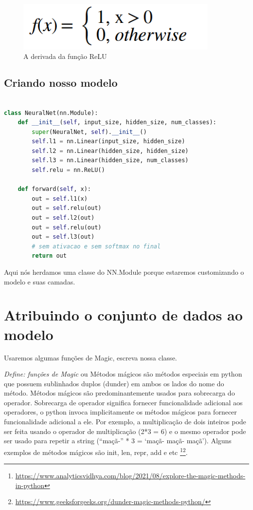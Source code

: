 \begin{figure}[H]
   \begin{center}
      \includegraphics[width=10cm]{img/relu3.png}
      \caption{A derivada da função ReLU} \label{relu3}
   \end{center}
\end{figure}


\subsection[Criando nosso modelo]{Criando nosso modelo}

\begin{lstlisting}[language=Python, caption=Modelo]

class NeuralNet(nn.Module):
    def __init__(self, input_size, hidden_size, num_classes):
        super(NeuralNet, self).__init__()
        self.l1 = nn.Linear(input_size, hidden_size)
        self.l2 = nn.Linear(hidden_size, hidden_size)
        self.l3 = nn.Linear(hidden_size, num_classes)
        self.relu = nn.ReLU()

    def forward(self, x):
        out = self.l1(x)
        out = self.relu(out)
        out = self.l2(out)
        out = self.relu(out)
        out = self.l3(out)
        # sem ativacao e sem softmax no final
        return out

\end{lstlisting}

Aqui nós herdamos uma classe do NN.Module porque estaremos customizando o modelo e suas camadas.


\section[Atribuindo o conjunto de dados ao modelo]{Atribuindo o conjunto de dados ao modelo}

Usaremos algumas funções de Magic, escreva nossa classe.

\textit{Define: funções de Magic} ou Métodos mágicos são métodos especiais em python que possuem sublinhados duplos (dunder) em ambos os lados do nome do método. Métodos mágicos são predominantemente usados para sobrecarga do operador. Sobrecarga de operador significa fornecer funcionalidade adicional aos operadores, o python invoca implicitamente os métodos mágicos para fornecer funcionalidade adicional a ele. Por exemplo, a multiplicação de dois inteiros pode ser feita usando o operador de multiplicação (2*3 = 6) e o mesmo operador pode ser usado para repetir a string (“maçã-” * 3 = ‘maçã- maçã- maçã’).
Alguns exemplos de métodos mágicos são init, len, repr, add e etc \footnote{\url{https://www.analyticsvidhya.com/blog/2021/08/explore-the-magic-methods-in-python}}\footnote{\url{https://www.geeksforgeeks.org/dunder-magic-methods-python/}}.


